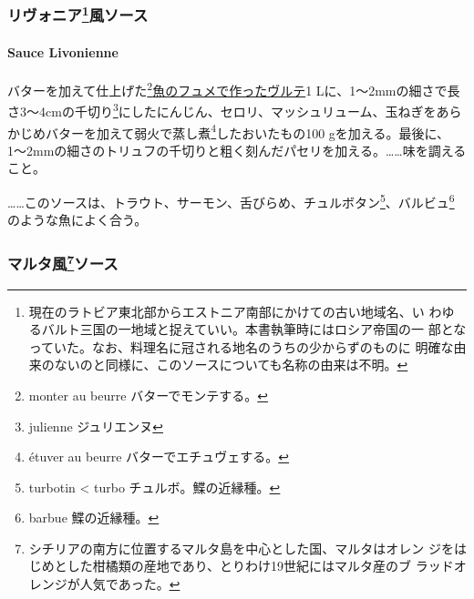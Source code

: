 \begin{recette}
\maeaki

\hypertarget{ux30eaux30f4ux30a9ux30cbux30a264ux98a8ux30bdux30fcux30b9}{%
\subsubsection[リヴォニア風ソース]{\texorpdfstring{リヴォニア\footnote{現在のラトビア東北部からエストニア南部にかけての古い地域名、い
  わゆるバルト三国の一地域と捉えていい。本書執筆時にはロシア帝国の一
  部となっていた。なお、料理名に冠される地名のうちの少からずのものに
  明確な由来のないのと同様に、このソースについても名称の由来は不明。}風ソース}{リヴォニア風ソース}}\label{ux30eaux30f4ux30a9ux30cbux30a264ux98a8ux30bdux30fcux30b9}}

\hypertarget{sauce-livonienne}{%
\paragraph{Sauce Livonienne}\label{sauce-livonienne}}


バターを加えて仕上げた\footnote{monter au beurre バターでモンテする。}\protect\hyperlink{veloute-de-poisson}{魚のフュメで作ったヴルテ}1
Lに、1〜2mmの細さで長さ3〜4cmの千切り\footnote{julienne ジュリエンヌ}にしたにんじん、セロリ、マッシュリューム、玉ねぎをあらかじめバターを加えて弱火で蒸し煮\footnote{étuver
  au beurre バターでエチュヴェする。}したおいたもの100
gを加える。最後に、1〜2mmの細さのトリュフの千切りと粗く刻んだパセリを加える。\ldots{}\ldots{}味を調えること。

\ldots{}\ldots{}このソースは、トラウト、サーモン、舌びらめ、チュルボタン\footnote{turbotin
  \textless{} turbo チュルボ。鰈の近縁種。}、バルビュ\footnote{barbue
  鰈の近縁種。}のような魚によく合う。

\maeaki

\hypertarget{ux30deux30ebux30bfux98a870ux30bdux30fcux30b9}{%
\subsubsection[マルタ風ソース]{\texorpdfstring{マルタ風\footnote{シチリアの南方に位置するマルタ島を中心とした国、マルタはオレン
  ジをはじめとした柑橘類の産地であり、とりわけ19世紀にはマルタ産のブ
  ラッドオレンジが人気であった。}ソース}{マルタ風ソース}}\label{ux30deux30ebux30bfux98a870ux30bdux30fcux30b9}}


\end{recette}
